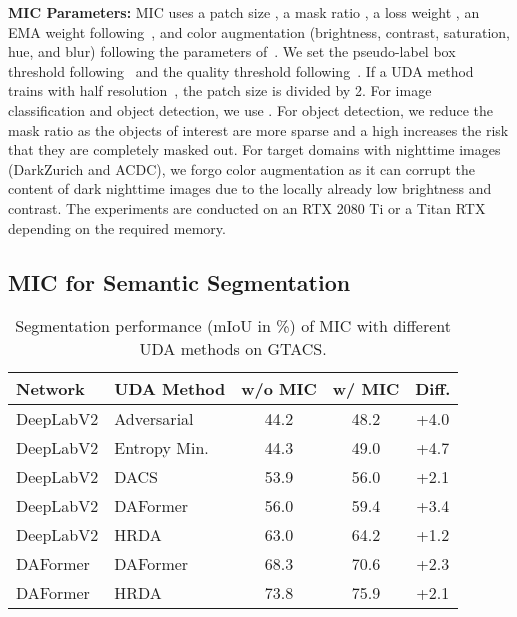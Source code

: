 \documentclass[10pt,twocolumn,letterpaper]{article}
\begin{document}
\noindent\textbf{MIC Parameters:}
MIC uses a patch size , a mask ratio , a loss weight , an EMA weight  following~\cite{hoyer2021daformer,hoyer2022hrda}, and color augmentation (brightness, contrast, saturation, hue, and blur) following the parameters of~\cite{tranheden2021dacs,hoyer2021daformer,hoyer2022hrda}.
We set the pseudo-label box threshold  following~\cite{deng2021unbiased, li2022cross} and the quality threshold  following~\cite{tranheden2021dacs,hoyer2021daformer,hoyer2022hrda}. 
If a UDA method trains with half resolution~\cite{tsai2018learning,vu2019advent,chen2021scale,tranheden2021dacs,hoyer2021daformer}, the patch size is divided by 2.
For image classification and object detection, we use .
For object detection, we reduce the mask ratio  as
the objects of interest are more sparse and a high  increases the risk that they are completely masked out.
For target domains with nighttime images (DarkZurich and ACDC), we forgo color augmentation as it can corrupt the content of dark nighttime images due to the locally already low brightness and contrast.
The experiments are conducted on an RTX 2080 Ti or a Titan RTX depending on the required memory.



\subsection{MIC for Semantic Segmentation}

\begin{table}
\centering
\caption{Segmentation performance (mIoU in \%) of MIC with different UDA methods on GTACS.}
\label{tab:other_uda}
\setlength{\tabcolsep}{5pt}
\scriptsize
\begin{tabular}{llccc}
\hline
                           Network &                          UDA Method & w/o MIC & w/ MIC & Diff. \\
\hline\hline
DeepLabV2 \cite{chen2017deeplab} & Adversarial \cite{tsai2018learning} &    44.2 &   48.2 &        +4.0 \\
DeepLabV2 \cite{chen2017deeplab} &    Entropy Min. \cite{vu2019advent} &    44.3 &   49.0 &        +4.7 \\
DeepLabV2 \cite{chen2017deeplab} &       DACS \cite{tranheden2021dacs} &    53.9 &   56.0 &        +2.1 \\
DeepLabV2 \cite{chen2017deeplab} &   DAFormer \cite{hoyer2021daformer} &    56.0 &   59.4 &        +3.4 \\
DeepLabV2 \cite{chen2017deeplab} &           HRDA \cite{hoyer2022hrda} &    63.0 &   64.2 &        +1.2 \\
\hline
DAFormer \cite{hoyer2021daformer} &   DAFormer \cite{hoyer2021daformer} &    68.3 &   70.6 &        +2.3 \\
DAFormer \cite{hoyer2021daformer} &           HRDA \cite{hoyer2022hrda} &    73.8 &   75.9 &        +2.1 \\
\hline
\end{tabular}
\end{table}
 
\end{document}
